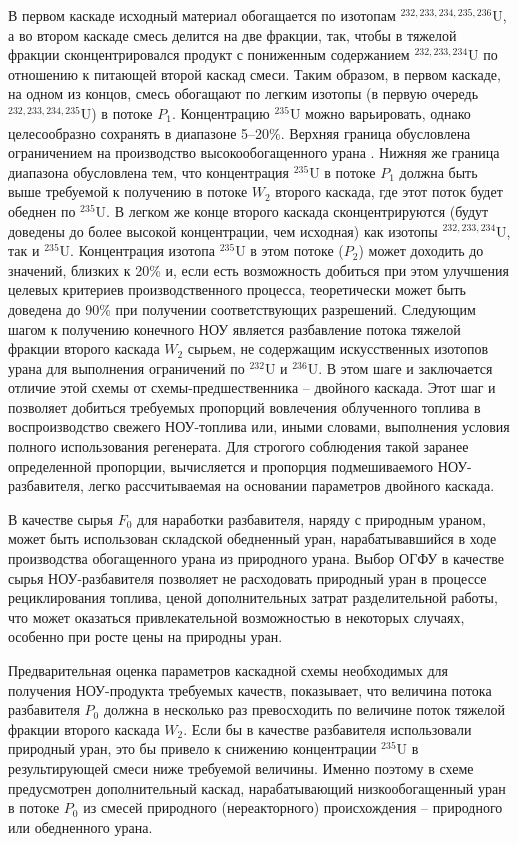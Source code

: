 В первом каскаде исходный материал обогащается по изотопам $^{232,233,234,235,236}$U, а во втором каскаде смесь делится на две фракции, так, чтобы в тяжелой фракции сконцентрировался продукт с пониженным содержанием $^{232,233,234}$U по отношению к питающей второй каскад смеси. Таким образом, в первом каскаде, на одном из концов, смесь обогащают по легким изотопы (в первую очередь $^{232,233,234,235}$U) в потоке $P_1$. Концентрацию $^{235}$U можно варьировать, однако целесообразно сохранять в диапазоне 5–20\%. Верхняя граница обусловлена ограничением на производство высокообогащенного урана \cite{brownOriginsSignificanceLimit2016}. Нижняя же граница диапазона обусловлена тем, что концентрация $^{235}$U в потоке $P_1$ должна быть выше требуемой к получению в потоке $W_2$ второго каскада, где этот поток будет обеднен по $^{235}$U. В легком же конце второго каскада сконцентрируются (будут доведены до более высокой концентрации, чем исходная) как изотопы $^{232,233,234}$U, так и $^{235}$U. Концентрация изотопа $^{235}$U в этом потоке ($P_2$) может доходить до значений, близких к 20\% и, если есть возможность добиться при этом улучшения целевых критериев производственного процесса, теоретически может быть доведена до 90\% при получении соответствующих разрешений. Следующим шагом к получению конечного НОУ является разбавление потока тяжелой фракции второго каскада $W_2$ сырьем, не содержащим искусственных изотопов урана для выполнения ограничений по $^{232}$U и $^{236}$U. В этом шаге и заключается отличие этой схемы от схемы-предшественника -- двойного каскада. Этот шаг и позволяет добиться требуемых пропорций вовлечения облученного топлива в воспроизводство свежего НОУ-топлива или, иными словами, выполнения условия полного использования регенерата. Для строгого соблюдения такой заранее определенной пропорции, вычисляется и пропорция подмешиваемого НОУ-разбавителя, легко рассчитываемая на основании параметров двойного каскада.

В качестве сырья $F_0$ для наработки разбавителя, наряду с природным ураном, может быть использован складской обедненный уран, нарабатывавшийся в ходе производства обогащенного урана из природного урана. Выбор ОГФУ в качестве сырья НОУ-разбавителя позволяет не расходовать природный уран в процессе рециклирования топлива, ценой дополнительных затрат разделительной работы, что может оказаться привлекательной возможностью в некоторых случаях, особенно при росте цены на природны уран.

Предварительная оценка параметров каскадной схемы необходимых для получения НОУ-продукта требуемых качеств, показывает, что величина потока разбавителя $P_0$ должна в несколько раз превосходить по величине поток тяжелой фракции второго каскада $W_2$. Если бы в качестве разбавителя использовали природный уран, это бы привело к снижению концентрации $^{235}$U в результирующей смеси ниже требуемой величины. Именно поэтому в схеме предусмотрен дополнительный каскад, нарабатывающий низкообогащенный уран в потоке $P_0$ из смесей природного (нереакторного) происхождения -- природного или обедненного урана.

